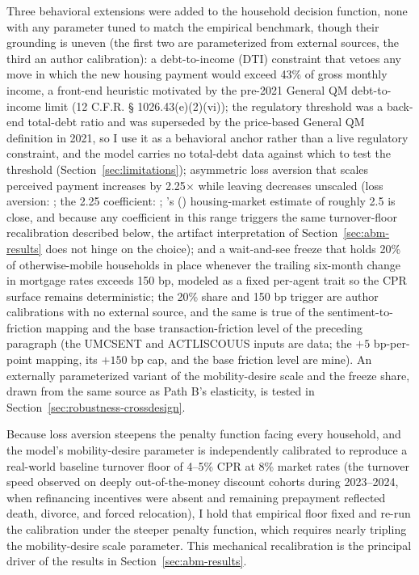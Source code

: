 \documentclass[12pt]{article}
\newcommand{\citepos}[1]{\citeauthor{#1}'s (\citeyear{#1})}
\begin{document}
Three behavioral extensions were added to the household decision function, none with any parameter tuned to match the empirical benchmark, though their grounding is uneven (the first two are parameterized from external sources, the third an author calibration): a debt-to-income (DTI) constraint that vetoes any move in which the new housing payment would exceed 43\% of gross monthly income, a front-end heuristic motivated by the pre-2021 General QM debt-to-income limit (12 C.F.R. \S{} 1026.43(e)(2)(vi)); the regulatory threshold was a back-end total-debt ratio and was superseded by the price-based General QM definition in 2021, so I use it as a behavioral anchor rather than a live regulatory constraint, and the model carries no total-debt data against which to test the threshold (Section~\ref{sec:limitations}); asymmetric loss aversion that scales perceived payment increases by 2.25$\times$ while leaving decreases unscaled (loss aversion: \citealp{kahneman1979}; the 2.25 coefficient: \citealp{tversky1992}; \citepos{andersen2022} housing-market estimate of roughly 2.5 is close, and because any coefficient in this range triggers the same turnover-floor recalibration described below, the artifact interpretation of Section~\ref{sec:abm-results} does not hinge on the choice); and a wait-and-see freeze that holds 20\% of otherwise-mobile households in place whenever the trailing six-month change in mortgage rates exceeds 150 bp, modeled as a fixed per-agent trait so the CPR surface remains deterministic; the 20\% share and 150 bp trigger are author calibrations with no external source, and the same is true of the sentiment-to-friction mapping and the base transaction-friction level of the preceding paragraph (the UMCSENT and ACTLISCOUUS inputs are data; the $+5$ bp-per-point mapping, its $+150$ bp cap, and the base friction level are mine). An externally parameterized variant of the mobility-desire scale and the freeze share, drawn from the same source as Path B's elasticity, is tested in Section~\ref{sec:robustness-crossdesign}.

Because loss aversion steepens the penalty function facing every household, and the model's mobility-desire parameter is independently calibrated to reproduce a real-world baseline turnover floor of 4--5\% CPR at 8\% market rates (the turnover speed observed on deeply out-of-the-money discount cohorts during 2023--2024, when refinancing incentives were absent and remaining prepayment reflected death, divorce, and forced relocation), I hold that empirical floor fixed and re-run the calibration under the steeper penalty function, which requires nearly tripling the mobility-desire scale parameter. This mechanical recalibration is the principal driver of the results in Section~\ref{sec:abm-results}.
\end{document}
